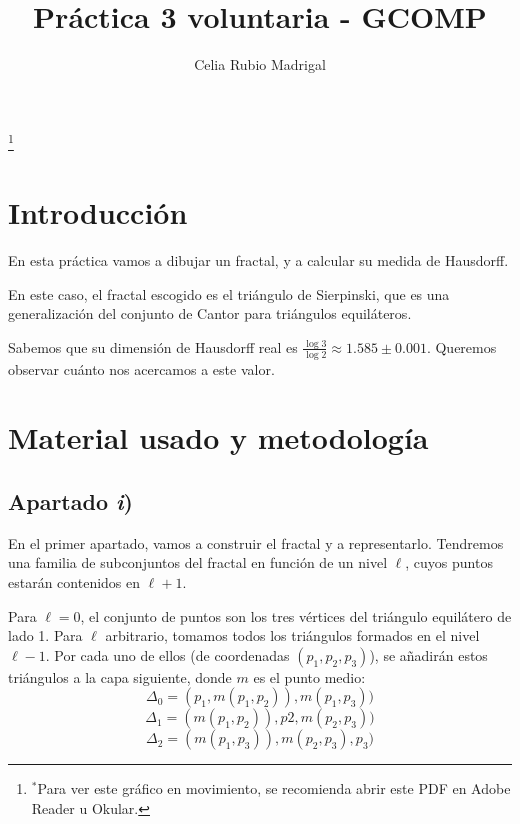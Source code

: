 \documentclass[a4paper]{article}
\author{Celia Rubio Madrigal}
\title{Práctica 3 voluntaria - GCOMP}
\begin{document}
	\maketitle
	
	\tableofcontents
	
	\vfill
	
	\begin{center}

\renewcommand{\thefootnote}{}\footnote{$^*$Para ver este gráfico en movimiento, se recomienda abrir este PDF en Adobe Reader u Okular.}
	\end{center}
	
	
	\vfill
	\newpage
	
	\section{Introducción}
	En esta práctica vamos a dibujar un fractal, y a calcular su medida de Hausdorff.
	
	En este caso, el fractal escogido es el triángulo de Sierpinski, que es una generalización del conjunto de Cantor para triángulos equiláteros.
	
	Sabemos que su dimensión de Hausdorff real es $\frac{\log 3}{\log 2} \approx 1.585 \pm 0.001 $. Queremos observar cuánto nos acercamos a este valor.
	
	\section{Material usado y metodología}
	
	
	\subsection{Apartado \textit{i})}
	En el primer apartado, vamos a construir el fractal y a representarlo. Tendremos una familia de subconjuntos del fractal en función de un nivel $\ell$, cuyos puntos estarán contenidos en $\ell+1$.
	
	Para $\ell=0$, el conjunto de puntos son los tres vértices del triángulo equilátero de lado 1. Para $\ell$ arbitrario, tomamos todos los triángulos formados en el nivel $\ell-1$. Por cada uno de ellos (de coordenadas $(p_1,p_2,p_3)$), se añadirán estos triángulos a la capa siguiente, donde $m$ es el punto medio:
	\[ \Delta_0 = (p_1 , m(p_1,p_2)), m(p_1,p_3)) \]
	\[ \Delta_1 = (m(p_1,p_2)), p2, m(p_2,p_3)) \]
	\[ \Delta_2 = (m(p_1,p_3)), m(p_2,p_3), p_3) \]
\end{document}
